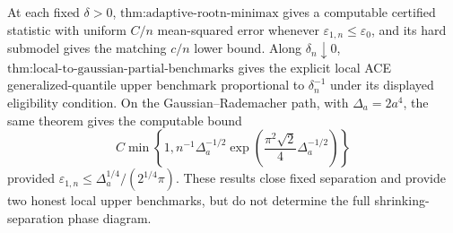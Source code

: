 At each fixed \(\delta>0\), \(\text{thm:adaptive-rootn-minimax}\) gives a computable certified statistic with uniform \(C/n\) mean-squared error whenever \(\varepsilon_{1,n}\le\varepsilon_0\), and its hard submodel gives the matching \(c/n\) lower bound.  Along \(\delta_n\downarrow0\), \(\text{thm:local-to-gaussian-partial-benchmarks}\) gives the explicit local ACE generalized-quantile upper benchmark proportional to \(\delta_n^{-1}\) under its displayed eligibility condition.  On the Gaussian--Rademacher path, with \(\Delta_a=2a^4\), the same theorem gives the computable bound
\[
 C\min\left\{1,
 n^{-1}\Delta_a^{-1/2}
 \exp\left(\frac{\pi^2\sqrt2}{4}\Delta_a^{-1/2}\right)
 \right\}
\]
provided \(\varepsilon_{1,n}\le\Delta_a^{1/4}/(2^{1/4}\pi)\).  These results close fixed separation and provide two honest local upper benchmarks, but do not determine the full shrinking-separation phase diagram.